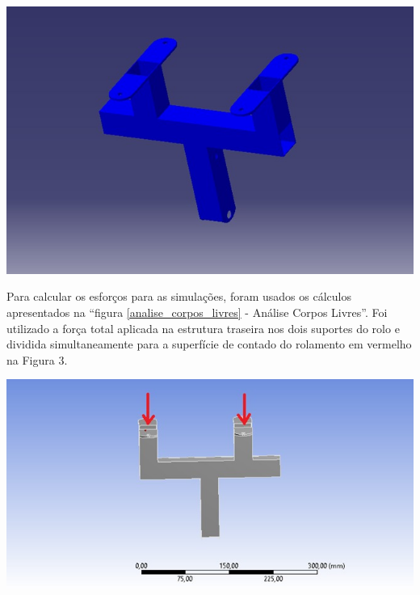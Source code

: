  
    \begin{center}
    	\includegraphics[scale=0.7]{figuras/esq_suporte_rolo_2}
        \label{esq_suporte_rolo_2}
    \end{center} 
 
Para calcular os esforços para as simulações, foram usados os cálculos apresentados na “figura \ref{analise_corpos_livres} - Análise Corpos Livres”.  Foi utilizado a força total aplicada na estrutura traseira nos dois suportes do rolo e dividida simultaneamente para a superfície de contado do rolamento em vermelho na Figura 3.

    \begin{center}
    	\includegraphics[scale=0.7]{figuras/forcas_3}
        \label{forcas_3}
    \end{center} 
  
